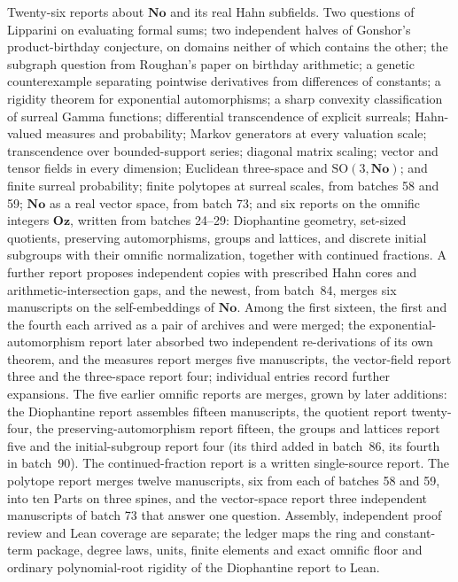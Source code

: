 \documentclass[11pt]{article}
\newcommand{\No}{\mathbf{No}}
\newcommand{\Oz}{\mathbf{Oz}}
\begin{document}
Twenty-six reports about $\No$ and its real Hahn subfields.  Two questions of
Lipparini on evaluating formal sums; two independent halves of Gonshor's
product-birthday conjecture, on domains neither of which contains the other;
the subgraph question from Roughan's paper on birthday arithmetic; a genetic
counterexample separating pointwise derivatives from differences of
constants; a rigidity theorem for exponential automorphisms; a sharp
convexity classification of surreal Gamma functions; differential
transcendence of explicit surreals; Hahn-valued measures and probability;
Markov generators at every valuation scale; transcendence over bounded-support
series; diagonal matrix scaling; vector and tensor fields in every
dimension; Euclidean three-space and $\mathrm{SO}(3,\No)$; and finite surreal
probability; finite polytopes at surreal scales, from batches 58 and 59; $\No$
as a real vector space, from batch 73; and six reports on the omnific integers $\Oz$, written from
batches 24--29: Diophantine geometry, set-sized quotients, preserving
automorphisms, groups and lattices, and discrete initial subgroups with their
omnific normalization, together with continued fractions. A further report proposes independent copies with
prescribed Hahn cores and arithmetic-intersection gaps, and the newest, from
batch~84, merges six manuscripts on the self-embeddings of $\No$. Among the first sixteen, the first and the fourth
each arrived as a pair of archives and were merged; the exponential-automorphism
report later absorbed two independent re-derivations of its own theorem, and
the measures report merges five manuscripts, the vector-field report three
and the three-space report four; individual entries record further expansions.
The five earlier omnific reports are merges, grown by later additions: the
Diophantine report assembles fifteen manuscripts, the quotient report
twenty-four, the preserving-automorphism report fifteen, the groups and lattices
report five and the initial-subgroup report four (its third added in
batch~86, its fourth in batch~90). The continued-fraction report
is a written single-source report. The polytope report merges twelve
manuscripts, six from each of batches 58 and 59, into ten Parts on three
spines, and the vector-space report three independent manuscripts of
batch 73 that answer one question. Assembly, independent proof
review and Lean coverage are separate; the ledger maps the ring and
constant-term package, degree laws, units, finite elements and exact
omnific floor and ordinary polynomial-root rigidity of the Diophantine
report to Lean.
\end{document}
